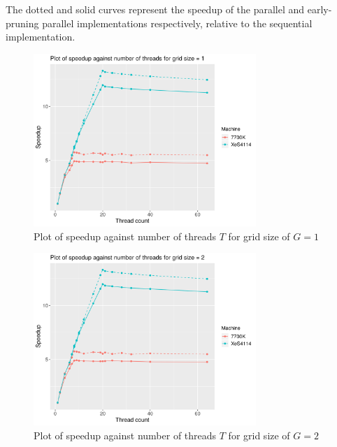 \documentclass[12pt]{article}
\begin{document}
The dotted and solid curves represent the speedup of the parallel and early-pruning parallel implementations respectively, relative to the sequential implementation.

\begin{figure}[H]
    \centering
    \includegraphics[width=0.75\textwidth]{optPar-gridSize1-speedup}
    \caption{Plot of speedup against number of threads $T$ for grid size of $G = 1$}
    \label{fig:optPar-gridSize1-speedup}
\end{figure}

\begin{figure}[H]
    \centering
    \includegraphics[width=0.75\textwidth]{optPar-gridSize2-speedup}
    \caption{Plot of speedup against number of threads $T$ for grid size of $G = 2$}
    \label{fig:optPar-gridSize2-speedup}
\end{figure}
\end{document}
